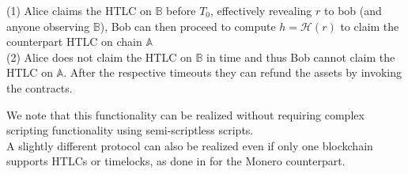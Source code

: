 \documentclass{article}      	%
\begin{document}
(1) Alice claims the HTLC on $\mathbb{B}$ before $T_0$, effectively revealing $r$ to bob (and anyone observing $\mathbb{B}$), Bob can then proceed to compute $h = \mathcal{H}(r)$ to claim the counterpart HTLC on chain $\mathbb{A}$ \\
(2) Alice does not claim the HTLC on $\mathbb{B}$ in time and thus Bob cannot claim the HTLC on $\mathbb{A}$. After the respective timeouts they can refund the assets by invoking the contracts.

We note that this functionality can be realized without requiring complex scripting functionality \cite{h4sh3d} using semi-scriptless scripts. \\
A slightly different protocol can also be realized even if only one blockchain supports HTLCs or timelocks, as done in \cite{h4sh3d} for the Monero counterpart.

\end{document}
